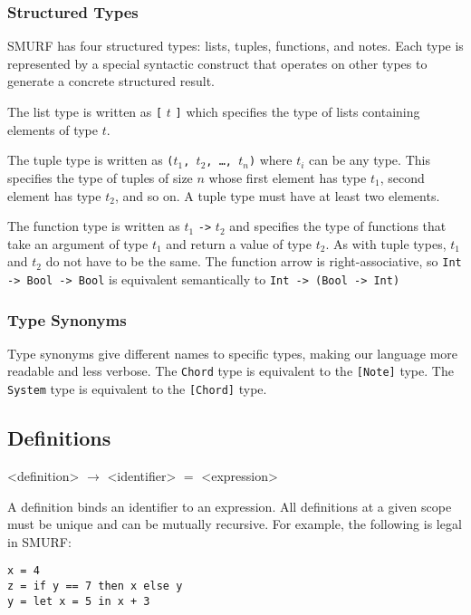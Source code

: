 \subsubsection{Structured Types}

SMURF has four structured types: lists, tuples, functions, and notes. Each
type is represented by a special syntactic construct that operates on
other types to generate a concrete structured result.

The list type is written as \texttt{[} $t$ \texttt{]} which specifies the type of lists
containing elements of type $t$.

The tuple type is written as \texttt{($t_1$, $t_2$, \ldots, $t_n$)} where $t_i$
can be any type. This specifies the type of tuples of size $n$ whose first
element has type $t_1$, second element has type $t_2$, and so on. A tuple
type must have at least two elements.

The function type is written as $t_1$ \texttt{->} $t_2$ and specifies the type
of functions that take an argument of type $t_1$ and return a value of type
$t_2$. As with tuple types, $t_1$ and $t_2$ do not have to be the same.
The function arrow is right-associative, so \texttt{Int -> Bool -> Bool} is
equivalent semantically to \texttt{Int -> (Bool -> Int)}


\subsubsection{Type Synonyms}

Type synonyms give different names to specific types, making our language
more readable and less verbose.
The \texttt{Chord} type is equivalent to the \texttt{[Note]} type.
The \texttt{System} type is equivalent to the \texttt{[Chord]} type.

\subsection{Definitions}

\begin{grammar}

<definition> $\rightarrow$ <identifier> $=$ <expression>

\end{grammar}

A definition binds an identifier to an expression. All definitions at a given
scope must be unique and can be mutually recursive. For example, the following
is legal in SMURF:

\begin{verbatim}
x = 4
z = if y == 7 then x else y
y = let x = 5 in x + 3
\end{verbatim}

